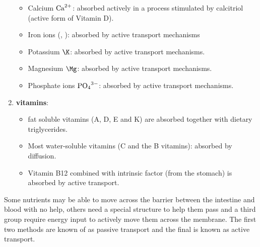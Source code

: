 \begin{enumerate}
\begin{itemize}
    \item Calcium ${\text{Ca}^{2+}}$: absorbed actively in a process stimulated by calcitriol
    (active form of Vitamin D).
    
    \item Iron ions (, ): absorbed by active transport
    mechanisms
    
    \item Potassium $\K$: absorbed by active transport mechanisms.
    
    \item Magnesium $\Mg$: absorbed by active transport mechanisms.
    
    \item Phosphate ions $\ce{PO_4^{3-}}$: absorbed by active transport
    mechanisms.
  \end{itemize}

  \item {\bf vitamins}: 
  \begin{itemize}
    \item fat soluble vitamins (A, D, E and K) are absorbed together with
    dietary triglycerides.
    
    \item Most water-soluble vitamins (C and the B vitamins):  absorbed by
    diffusion.
    
    \item Vitamin B12 combined with intrinsic factor (from the stomach) is
    absorbed by active transport.
  \end{itemize}
\end{enumerate}


Some nutrients may be able to move across the barrier between the intestine and
blood with no help, others need a special structure to help them pass and a
third group require energy input to actively move them across the membrane. The
first two methods are known of as passive transport and the final is known as
active transport. 

